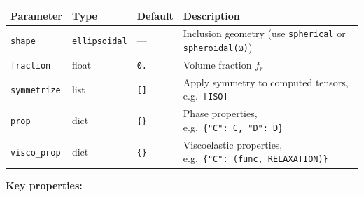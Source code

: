 \documentclass[
  a4paper,
  numbers=noendperiod,
  DIV=12]{scrreprt}
\newcounter{none} %
\begin{document}
{\def\LTcaptype{none} %
\begin{longtable}[]{@{}
  >{\raggedright\arraybackslash}p{}
  >{\raggedright\arraybackslash}p{}
  >{\raggedright\arraybackslash}p{}
  >{\raggedright\arraybackslash}p{}@{}}
\toprule\noalign{}
\begin{minipage}[b]{\linewidth}\raggedright
Parameter
\end{minipage} & \begin{minipage}[b]{\linewidth}\raggedright
Type
\end{minipage} & \begin{minipage}[b]{\linewidth}\raggedright
Default
\end{minipage} & \begin{minipage}[b]{\linewidth}\raggedright
Description
\end{minipage} \\
\midrule\noalign{}
\endhead
\bottomrule\noalign{}
\endlastfoot
\texttt{shape} & \texttt{ellipsoidal} & --- & Inclusion geometry (use
\texttt{spherical} or \texttt{spheroidal(ω)}) \\
\texttt{fraction} & float & \texttt{0.} & Volume fraction \(f_r\) \\
\texttt{symmetrize} & list & \texttt{{[}{]}} & Apply symmetry to
computed tensors, e.g.~\texttt{{[}ISO{]}} \\
\texttt{prop} & dict & \texttt{\{\}} & Phase properties,
e.g.~\texttt{\{"C":\ C,\ "D":\ D\}} \\
\texttt{visco\_prop} & dict & \texttt{\{\}} & Viscoelastic properties,
e.g.~\texttt{\{"C":\ (func,\ RELAXATION)\}} \\
\end{longtable}
}

\textbf{Key properties:}
\end{document}
